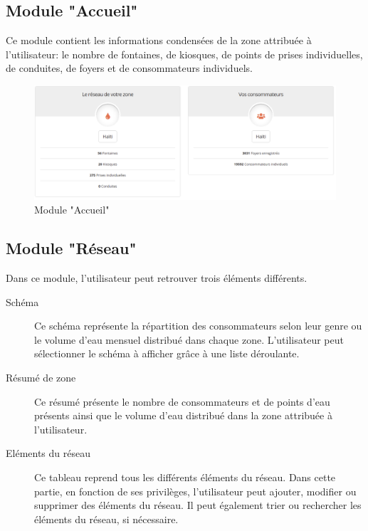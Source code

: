 \documentclass{EPL-master-thesis-covers-FR}
\begin{document}
			
			\subsection{Module "Accueil"}
				Ce module contient les informations condensées de la zone attribuée à l'utilisateur: le nombre de fontaines, de kiosques, de points de prises individuelles, de conduites, de foyers et de consommateurs individuels. 
								
				\begin{figure}[H]
					\centering
					\includegraphics[width=1\textwidth]{images/dashboard}
					\caption{Module "Accueil"}
				\end{figure}
				
				
			\subsection{Module "Réseau"}
				\label{sec:reseau}
				Dans ce module, l'utilisateur peut retrouver trois éléments différents.
				
				\begin{description}
				\item[Schéma] Ce schéma représente la répartition des consommateurs selon leur genre ou le volume d'eau mensuel distribué dans chaque zone. L'utilisateur peut sélectionner le schéma à afficher grâce à une liste déroulante.
				\item[Résumé de zone] Ce résumé présente le nombre de consommateurs et de points d'eau présents ainsi que le volume d'eau distribué dans la zone attribuée à l'utilisateur.
				\item[Eléments du réseau] Ce tableau reprend tous les différents éléments du réseau. Dans cette partie, en fonction de ses privilèges, l'utilisateur peut ajouter, modifier ou supprimer des éléments du réseau. Il peut également trier ou rechercher les éléments du réseau, si nécessaire.
				\end{description}
				
\end{document}

